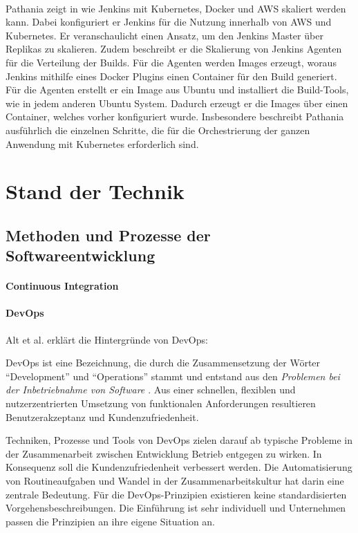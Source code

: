\medskip
\\
Pathania zeigt in \cite{Pathania2017} wie Jenkins mit Kubernetes, Docker und \ac{AWS} skaliert werden kann. Dabei konfiguriert er Jenkins für die Nutzung innerhalb von \ac{AWS} und Kubernetes. Er veranschaulicht einen Ansatz, um den Jenkins Master über Replikas zu skalieren. Zudem beschreibt er die Skalierung von Jenkins Agenten für die Verteilung der Builds. Für die Agenten werden Images erzeugt, woraus Jenkins mithilfe eines Docker Plugins einen Container für den Build generiert. Für die Agenten erstellt er ein Image aus Ubuntu und installiert die Build-Tools, wie in jedem anderen Ubuntu System.
Dadurch erzeugt er die Images über einen Container, welches vorher konfiguriert wurde. Insbesondere beschreibt Pathania ausführlich die einzelnen Schritte, die für die Orchestrierung der ganzen Anwendung mit Kubernetes erforderlich sind.

\section{Stand der Technik}

\subsection{Methoden und Prozesse der Softwareentwicklung}

\paragraph{Continuous Integration}

\paragraph{DevOps}
Alt et al. erklärt die Hintergründe von DevOps:

DevOps ist eine Bezeichnung, die durch die Zusammensetzung der Wörter \enquote{Development} und \enquote{Operations} stammt und entstand aus den \emph{Problemen bei der Inbetriebnahme von Software \cite{mci/Disterer2011}}.
Aus einer schnellen, flexiblen und nutzerzentrierten Umsetzung von funktionalen Anforderungen resultieren Benutzerakzeptanz und Kundenzufriedenheit. 

Techniken, Prozesse und Tools von DevOps zielen darauf ab typische Probleme in der Zusammenarbeit zwischen Entwicklung Betrieb entgegen zu wirken. In Konsequenz soll die Kundenzufriedenheit verbessert werden. Die Automatisierung von Routineaufgaben und Wandel in der Zusammenarbeitskultur hat darin eine zentrale Bedeutung. Für die DevOps-Prinzipien existieren keine standardisierten Vorgehensbeschreibungen. Die Einführung ist sehr individuell und Unternehmen passen die Prinzipien an ihre eigene Situation an. 

